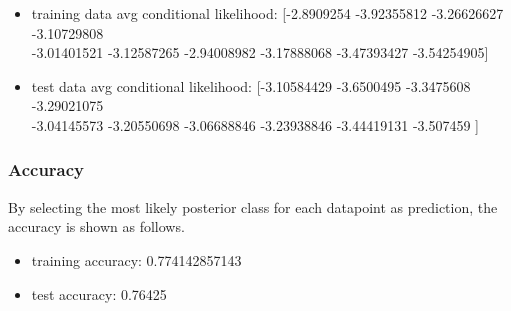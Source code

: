 \documentclass[a4paper]{article}
\begin{document}
\begin{itemize}
    \item training data avg conditional likelihood: [-2.8909254  -3.92355812 -3.26626627 -3.10729808\\-3.01401521 -3.12587265
 -2.94008982 -3.17888068 -3.47393427 -3.54254905]
    \item test data avg conditional likelihood: [-3.10584429 -3.6500495  -3.3475608  -3.29021075\\-3.04145573 -3.20550698
 -3.06688846 -3.23938846 -3.44419131 -3.507459  ]
\end{itemize}

\subsubsection{Accuracy}

By selecting the most likely posterior class for each datapoint as prediction, the accuracy is shown as follows.

\begin{itemize}
    \item training accuracy: 0.774142857143
    \item test accuracy: 0.76425
\end{itemize}



\end{document}
